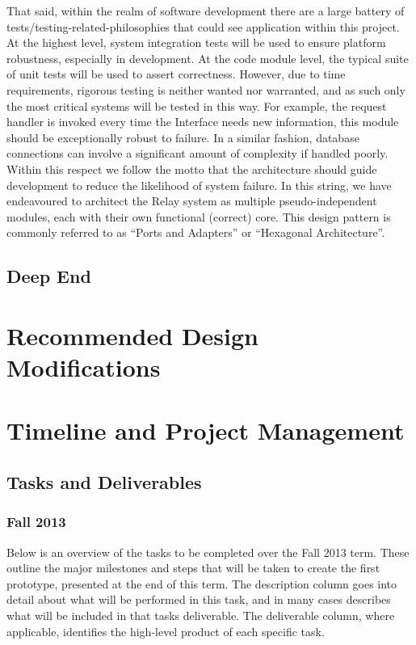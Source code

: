 \documentclass{report}
\begin{document}
That said, within the realm of software development there are a large battery of tests/testing-related-philosophies that could see application within this project.
At the highest level, system integration tests will be used to ensure platform robustness, especially in development.
At the code module level, the typical suite of unit tests will be used to assert correctness.
However, due to time requirements, rigorous testing is neither wanted nor warranted, and as such only the most critical systems will be tested in this way.
For example, the request handler is invoked every time the Interface needs new information, this module should be exceptionally robust to failure.
In a similar fashion, database connections can involve a significant amount of complexity if handled poorly.
Within this respect we follow the motto that the architecture should guide development to reduce the likelihood of system failure.
In this string, we have endeavoured to architect the Relay system as multiple pseudo-independent modules, each with their own functional (correct) core.
This design pattern is commonly referred to as ``Ports and Adapters'' or ``Hexagonal Architecture''.

\section{Deep End}

\newpage
\chapter{Recommended Design Modifications}

\newpage
\chapter{Timeline and Project Management}

\section{Tasks and Deliverables}

\subsection{Fall 2013}
Below is an overview of the tasks to be completed over the Fall 2013 term. 
These outline the major milestones and steps that will be taken to create the first prototype, presented at the end of this term. 
The description column goes into detail about what will be performed in this task, and in many cases describes what will be included in that tasks deliverable. 
The deliverable column, where applicable, identifies the high-level product of each specific task.
\\
\end{document}
